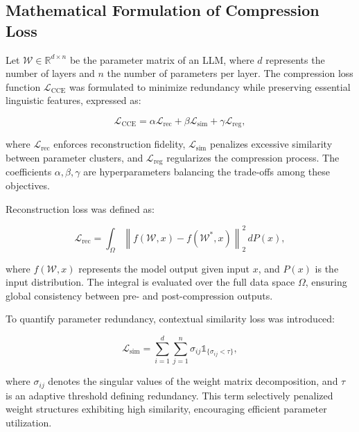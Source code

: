 \documentclass{article}
\begin{document}
\subsection{Mathematical Formulation of Compression Loss}

Let \( \mathcal{W} \in \mathbb{R}^{d \times n} \) be the parameter matrix of an LLM, where \( d \) represents the number of layers and \( n \) the number of parameters per layer. The compression loss function \( \mathcal{L}_{\text{CCE}} \) was formulated to minimize redundancy while preserving essential linguistic features, expressed as:

\begin{equation}
	\mathcal{L}_{\text{CCE}} = \alpha \mathcal{L}_{\text{rec}} + \beta \mathcal{L}_{\text{sim}} + \gamma \mathcal{L}_{\text{reg}},
\end{equation}

where \( \mathcal{L}_{\text{rec}} \) enforces reconstruction fidelity, \( \mathcal{L}_{\text{sim}} \) penalizes excessive similarity between parameter clusters, and \( \mathcal{L}_{\text{reg}} \) regularizes the compression process. The coefficients \( \alpha, \beta, \gamma \) are hyperparameters balancing the trade-offs among these objectives.

Reconstruction loss was defined as:

\begin{equation}
	\mathcal{L}_{\text{rec}} = \int_{\Omega} \left\| f(\mathcal{W}, x) - f(\mathcal{W}^{*}, x) \right\|_2^2 \, dP(x),
\end{equation}

where \( f(\mathcal{W}, x) \) represents the model output given input \( x \), and \( P(x) \) is the input distribution. The integral is evaluated over the full data space \( \Omega \), ensuring global consistency between pre- and post-compression outputs.

To quantify parameter redundancy, contextual similarity loss was introduced:

\begin{equation}
	\mathcal{L}_{\text{sim}} = \sum_{i=1}^{d} \sum_{j=1}^{n} \sigma_{ij} \mathbb{1}_{\{\sigma_{ij} < \tau\}},
\end{equation}

where \( \sigma_{ij} \) denotes the singular values of the weight matrix decomposition, and \( \tau \) is an adaptive threshold defining redundancy. This term selectively penalized weight structures exhibiting high similarity, encouraging efficient parameter utilization.
\end{document}
